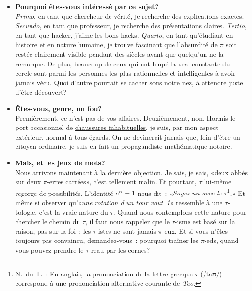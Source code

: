\begin{itemize}
  \item \textbf{Pourquoi êtes-vous intéressé par ce sujet\ns?} \\ \emph{Primo}, en
  tant que chercheur de vérité, je recherche des explications exactes.
  \emph{Secundo}, en tant que professeur, je recherche des présentations
  claires. \emph{Tertio}, en tant que hacker, j'aime les bons hacks.
  \emph{Quarto}, en tant qu'étudiant en histoire et en nature humaine, je
  trouve fascinant que l'absurdité de $\pi$ soit restée clairement visible pendant des
  siècles avant que quelqu'un ne la remarque. De plus, beaucoup de ceux
  qui ont loupé la vrai constante du cercle sont parmi les personnes les plus
  rationnelles et intelligentes à avoir jamais vécu. Quoi d'autre pourrait se
  cacher sous notre nez, à attendre juste d'être découvert\ns?

  \item \textbf{Êtes-vous, genre, un fou\ns?} \\ Premièrement, ce n'est pas de vos
  affaires. Deuxièmement, non. Hormis le port occasionnel de
  \href{https://fr.wikipedia.org/wiki/Chaussure_à_orteils}{chaussures
  inhabituelles}, je suis, par mon aspect extérieur, normal à tous
  égards. On ne devinerait jamais que, loin d'être un citoyen ordinaire,
  je suis en fait un propagandiste mathématique notoire.

  \item \textbf{Mais, et les jeux de mots\ns?} \\ Nous arrivons
  maintenant à la dernière objection. Je sais, je sais,
  «\ns deux abbés sur deux $\pi$-erres carrées\ns », c'est
  tellement malin. Et pourtant, $\tau$ lui-même regorge de
  possibilités. L'identité $e^{i\tau} = 1$ nous
  dit~: «\ns \emph{Soyez un avec le $\tau$}\ns\footnote{N.\ du T.~: En anglais,
  la prononciation de la lettre grecque $\tau$
  (\href{https://fr.wikipedia.org/wiki/Alphabet_phonétique_international}{/taʊ/})
  correspond à une prononciation alternative courante de
  \emph{Tao}.}\emph{.}\ns » Et même si observer qu'«\ns \emph{une rotation d'un tour vaut~1}\ns »
  ressemble à une $\tau$-tologie, c'est la vraie nature du $\tau$. Quand nous contemplons cette nature
  pour chercher le \href{https://fr.wikipedia.org/wiki/Tao_(culture)}{chemin} du
  $\tau$, il faut nous rappeler que le $\tau$-isme est basé sur la raison, pas
  sur la foi~: les $\tau$-istes ne sont jamais $\pi$-eux. Et si vous n'êtes
  toujours pas convaincu, demandez-vous~: pourquoi traîner les $\pi$-eds, quand
  vous pouvez prendre le $\tau$-reau par les cornes\ns ?

\end{itemize}

